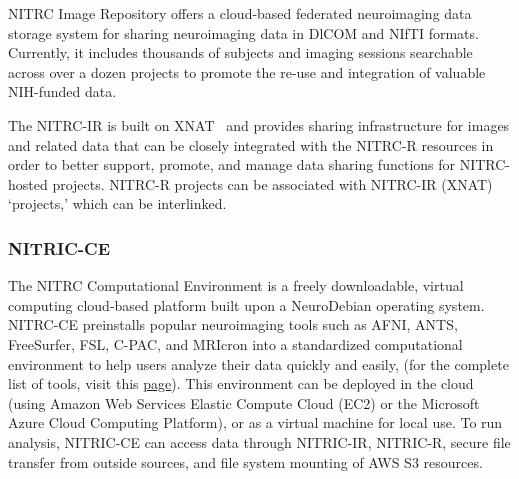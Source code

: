 NITRC Image Repository offers a cloud-based federated neuroimaging data storage system for sharing neuroimaging data in DlCOM and NIfTI formats. Currently, it includes thousands of subjects and imaging sessions searchable across over a dozen projects to promote the re-use and integration of valuable NIH-funded data.

The NITRC-IR is built on XNAT~\cite{marcus2007extensible} and provides sharing infrastructure for images and related data that can be closely integrated with the NITRC-R resources in order to better support, promote, and manage data sharing functions for NITRC-hosted projects.
NITRC-R projects can be associated with NITRC-IR (XNAT) ‘projects,’ which can be interlinked. 


\subsubsection{NITRIC-CE}

The NITRC Computational Environment is a freely downloadable, virtual computing cloud-based platform built upon a NeuroDebian operating system. NITRC-CE preinstalls popular neuroimaging tools such as AFNI, ANTS, FreeSurfer, FSL, C-PAC, and MRIcron into a standardized computational environment to help users analyze their data quickly and easily, (for the complete list of tools, visit this \href{https://www.nitrc.org/plugins/mwiki/index.php/nitrc:User_Guide_-_NITRC-CE_Installed_Packages}{page}). This environment can be deployed in the cloud (using Amazon Web Services Elastic Compute Cloud (EC2) or the Microsoft Azure Cloud Computing Platform), or as a virtual machine for local use. To run analysis, NITRIC-CE can access data through NITRIC-IR, NITRIC-R, secure ﬁle transfer from outside sources, and ﬁle system mounting of AWS S3 resources.



